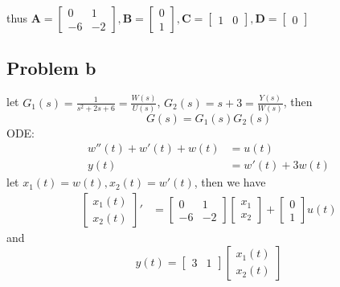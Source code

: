 \documentclass[12pt,a4paper]{article}
\begin{document}
thus
$
    \mathbf{A} =
    \begin{bmatrix}
        0  & 1  \\
        -6 & -2
    \end{bmatrix},
    \mathbf{B} =
    \begin{bmatrix}
        0 \\
        1
    \end{bmatrix},
    \mathbf{\mathbf{C}} = \begin{bmatrix}
        1 & 0
    \end{bmatrix},
    \mathbf{D} =
    \begin{bmatrix}
        0
    \end{bmatrix}
$

\subsection*{Problem b}
let $G_1(s)=\frac{1}{s^2+2s+6}=\frac{W(s)}{U(s)}$, $G_2(s)=s+3=\frac{Y(s)}{W(s)}$, then
\[G(s)  = G_1(s)G_2(s) \]
ODE:
\begin{equation}
    \begin{aligned}
        w''(t) + w'(t) + w(t) & = u(t)    \\
        y(t)            & = w'(t) + 3w(t)
    \end{aligned}
\end{equation}
let $ x_1(t) = w(t), x_2(t) = w'(t)$, then we have
\begin{equation}
    \begin{aligned}
        \begin{bmatrix}
            {x_1(t)} \\
            {x_2(t)}
        \end{bmatrix}' & = \begin{bmatrix}
                               0  & 1  \\
                               -6 & -2
                           \end{bmatrix} \begin{bmatrix}
                                             x_1 \\
                                             x_2
                                         \end{bmatrix} + \begin{bmatrix}
                                                             0 \\
                                                             1
                                                         \end{bmatrix} u(t)
    \end{aligned}
\end{equation}
and
\[ y(t) = \begin{bmatrix}
        3 & 1
    \end{bmatrix} \begin{bmatrix}
                      x_1(t) \\
                      x_2(t)
                  \end{bmatrix} \]
\end{document}
